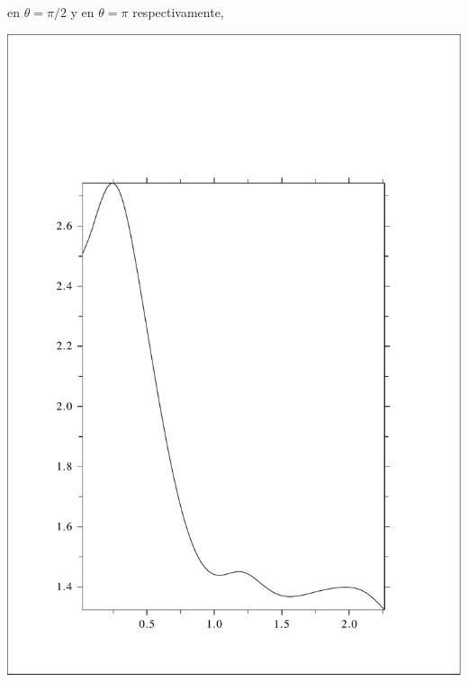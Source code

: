 \documentclass [11pt,spanish]{article}
\begin{document}
en $\theta=\pi/2$ y en $\theta=\pi$ respectivamente,

\includegraphics[scale=0.4]{RES_1s_tt1abspi2.pdf}
\end{document}
